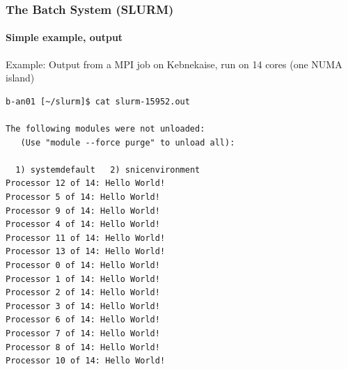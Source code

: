 \documentclass{beamer}
\begin{document}


\begin{frame}[fragile]\frametitle{The Batch System (SLURM)}\framesubtitle{Simple example, output} 

  \begin{block}{}
    \justify
Example: Output from a MPI job on Kebnekaise, run on 14 cores (one NUMA island)
  \end{block}

  \begin{block}{}
\begin{tiny}
\begin{verbatim}
b-an01 [~/slurm]$ cat slurm-15952.out 

The following modules were not unloaded:
   (Use "module --force purge" to unload all):

  1) systemdefault   2) snicenvironment
Processor 12 of 14: Hello World!
Processor 5 of 14: Hello World!
Processor 9 of 14: Hello World!
Processor 4 of 14: Hello World!
Processor 11 of 14: Hello World!
Processor 13 of 14: Hello World!
Processor 0 of 14: Hello World!
Processor 1 of 14: Hello World!
Processor 2 of 14: Hello World!
Processor 3 of 14: Hello World!
Processor 6 of 14: Hello World!
Processor 7 of 14: Hello World!
Processor 8 of 14: Hello World!
Processor 10 of 14: Hello World!
\end{verbatim}
\end{tiny}
  \end{block}

\end{frame}
\end{document}
